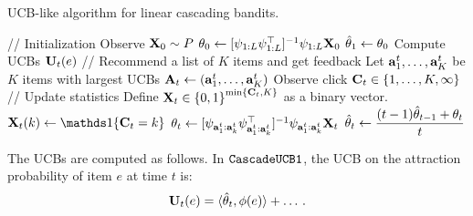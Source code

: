 \begin{algorithm}[t]
  \caption{UCB-like algorithm for linear cascading bandits.}
  \label{alg:ucb}
  \begin{algorithmic}
    \STATE // Initialization
    \STATE Observe $\mathbf{X}_0 \sim P$
    \STATE $\mathbf{\theta}_0 \gets [\psi_{1:L} \psi_{1:L}^\top]^{-1} \psi_{1:L} \mathbf{X}_0$
    \STATE $\hat{\mathbf{\theta}}_1 \gets \mathbf{\theta}_0$
    \STATE
      \STATE Compute UCBs $\mathbf{U}_t(e)$ %
      \STATE
      \STATE // Recommend a list of $K$ items and get feedback
      \STATE Let $\mathbf{a}^t_1, \dots, \mathbf{a}^t_K$ be $K$ items with largest UCBs
      \STATE $\mathbf{A}_t \gets (\mathbf{a}^t_1, \dots, \mathbf{a}^t_K)$
      \STATE Observe click $\mathbf{C}_t \in \left\{1, \dots, K, \infty\right\}$
      \STATE
      \STATE // Update statistics
      \STATE Define $\mathbf{X}_t \in \left\{0,1\right\}^{\min \left\{\mathbf{C}_t, K\right\}}$ as a binary vector.
        \STATE $\rnd{X}_t(k) \gets \I{\rnd{C}_t = k}$
      \ENDFOR
      \STATE $\mathbf{\theta}_t \gets [\psi_{\mathbf{a}^t_1:\mathbf{a}^t_k} \psi_{\mathbf{a}^t_1:\mathbf{a}^t_k}^\top]^{-1} \psi_{\mathbf{a}^t_1:\mathbf{a}^t_k} \mathbf{X}_t$
      \STATE $\displaystyle \hat{\mathbf{\theta}}_t \gets \frac{(t - 1) \hat{\mathbf{\theta}}_{t - 1} + \mathbf{\theta}_t}{t}$
    \ENDFOR
  \end{algorithmic}
\end{algorithm}

The UCBs are computed as follows. In ${\tt CascadeUCB1}$, the UCB on the attraction probability of item $e$ at time $t$ is:
\begin{align*}
  \mathbf{U}_t(e) = \langle \hat{\mathbf{\theta}}_t,\phi(e) \rangle + \dots\,.
\end{align*}

